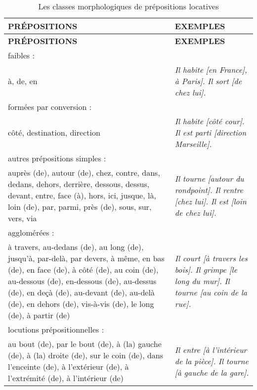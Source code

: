 \documentclass[UTF8]{report}
\begin{document}
\begin{table}[H]
    \centering
    \begin{longtable}{|m{7cm}|m{8cm}|}
    \hline
    \rowcolor{cyan!20}
    \textbf{PRÉPOSITIONS} & \textbf{EXEMPLES} \\
    \hline
    \endfirsthead
    \hline
    \rowcolor{cyan!20}
    \textbf{PRÉPOSITIONS} & \textbf{EXEMPLES} \\
    \hline
    \endhead
    \hline
    \endfoot
    \hline
    \endlastfoot
    
    faibles : & \\
    à, de, en & \textit{Il habite [en France], à Paris].} \newline \textit{Il sort [de chez lui].} \\
    \hline
    formées par conversion : & \\
    côté, destination, direction & \textit{Il habite [côté cour].} \newline \textit{Il est parti [direction Marseille].} \\
    \hline
    autres prépositions simples : & \\
    auprès (de), autour (de), chez, contre, dans, dedans, dehors, derrière, dessous, dessus, devant, entre, face (à), hors, ici, jusque, là, loin (de), par, parmi, près (de), sous, sur, vers, via & \textit{Il tourne [autour du rondpoint].} \newline \textit{Il rentre [chez lui].} \newline \textit{Il est [loin de chez lui].} \\
    \hline
    agglomérées : & \\
    à travers, au-dedans (de), au long (de), jusqu'à, par-delà, par devers, à même, en bas (de), en face (de), à côté (de), au coin (de), au-dessous (de), en-dessous (de), au-dessus (de), en deçà (de), au-devant (de), au-delà (de), en dehors (de), vis-à-vis (de), le long (de), à partir (de) & \textit{Il court [à travers les bois].} \newline \textit{Il grimpe [le long du mur].} \newline \textit{Il tourne [au coin de la rue].} \\
    \hline
    locutions prépositionnelles : & \\
    au bout (de), par le bout (de), à (la) gauche (de), à (la) droite (de), sur le coin (de), dans l'enceinte (de), à l'extérieur (de), à l'extrémité (de), à l'intérieur (de) & \textit{Il entre [à l'intérieur de la pièce].} \newline \textit{Il tourne [à gauche de la gare].} \\
    \hline
    \end{longtable}
    \caption{Les classes morphologiques de prépositions locatives}
\end{table}
\end{document}
